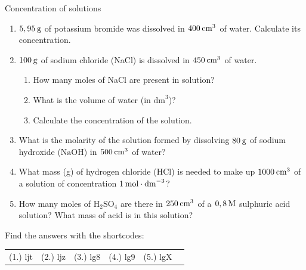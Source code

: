             \begin{exercises}{ Concentration of solutions
      }
            \nopagebreak \noindent
      \label{m38712*id283713}\begin{enumerate}[noitemsep, label=\textbf{\arabic*}. ] 
            \label{m38712*uid92}\item $5,95\phantom{\rule{2pt}{0ex}}\text{g}$ of potassium bromide was dissolved in $400\phantom{\rule{2pt}{0ex}}{\text{cm}}^{3}$ of water. Calculate its concentration.\newline
\label{m38712*uid93}\item $100\phantom{\rule{2pt}{0ex}}\text{g}$ of sodium chloride (NaCl) is dissolved in $450\phantom{\rule{2pt}{0ex}}{\text{cm}}^{3}$ of water.
\label{m38712*id283768}\begin{enumerate}[noitemsep, label=\textbf{\alph*}. ] 
            \label{m38712*uid94}\item How many moles of NaCl are present in solution?
\label{m38712*uid95}\item What is the volume of water (in ${\text{dm}}^{3}$)?
\label{m38712*uid96}\item Calculate the concentration of the solution.
\end{enumerate}
                \label{m38712*uid98}\item What is the molarity of the solution formed by dissolving $80\phantom{\rule{2pt}{0ex}}\text{g}$ of sodium hydroxide ($\text{NaOH}$) in $500\phantom{\rule{2pt}{0ex}}{\text{cm}}^{3}$ of water?\newline
\label{m38712*uid99}\item What mass (g) of hydrogen chloride ($\text{HCl}$) is needed to make up $1000\phantom{\rule{2pt}{0ex}}{\text{cm}}^{3}$ of a solution of concentration $1\phantom{\rule{2pt}{0ex}}\text{mol}\ensuremath{\cdot}{\text{dm}}^{-3}$?\newline
\label{m38712*uid100}\item How many moles of $\text{H}{}_{2}\text{SO}{}_{4}$ are there in $250\phantom{\rule{2pt}{0ex}}{\text{cm}}^{3}$ of a $0,8\phantom{\rule{2pt}{0ex}}\text{M}$ sulphuric acid solution? What mass of acid is in this solution?\newline
\end{enumerate}
    \label{m38712*cid9}
\par {} Find the answers with the shortcodes:
 \par \begin{tabular}[h]{cccccc}
 (1.) ljt  &  (2.) ljz  &  (3.) lg8  &  (4.) lg9  &  (5.) lgX  & \end{tabular}
\end{exercises}
